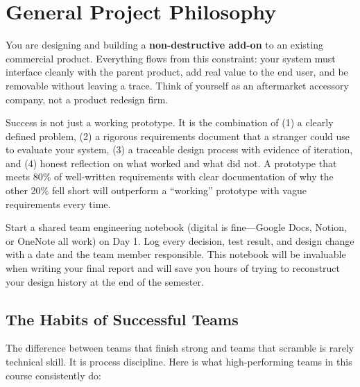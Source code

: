 \documentclass[11pt,letterpaper]{article}
\begin{document}
\tableofcontents
\newpage

\section{General Project Philosophy}

\begin{faqbox}
You are designing and building a \textbf{non-destructive add-on} to an existing commercial product. Everything flows from this constraint: your system must interface cleanly with the parent product, add real value to the end user, and be removable without leaving a trace. Think of yourself as an aftermarket accessory company, not a product redesign firm.
\end{faqbox}

\begin{faqbox}
Success is not just a working prototype. It is the combination of (1) a clearly defined problem, (2) a rigorous requirements document that a stranger could use to evaluate your system, (3) a traceable design process with evidence of iteration, and (4) honest reflection on what worked and what did not. A prototype that meets 80\% of well-written requirements with clear documentation of why the other 20\% fell short will outperform a ``working'' prototype with vague requirements every time.
\end{faqbox}

\begin{tipbox}
Start a shared team engineering notebook (digital is fine---Google Docs, Notion, or OneNote all work) on Day 1. Log every decision, test result, and design change with a date and the team member responsible. This notebook will be invaluable when writing your final report and will save you hours of trying to reconstruct your design history at the end of the semester.
\end{tipbox}

\subsection{The Habits of Successful Teams}

The difference between teams that finish strong and teams that scramble is rarely technical skill. It is process discipline. Here is what high-performing teams in this course consistently do:
\end{document}
